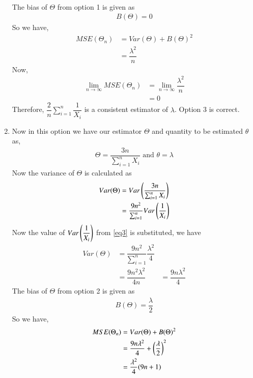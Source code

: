 \begin{enumerate}
\begin{align}
    \end{align}
    The bias of $ \Theta $ from option 1 is given as
    \begin{align}
        B(\Theta) = 0
    \end{align}
    So we have,
    \begin{align}
        MSE(\Theta_n) &= Var(\Theta) + B(\Theta)^2 \\
        &= \dfrac{\lambda^2}{n}
    \end{align}
    Now,
    \begin{align}
         \lim_{n\to\infty} MSE( \Theta_n) &=    \lim_{n\to\infty} \dfrac{\lambda^2}{n} \\
          &= 0
    \end{align}
    Therefore, $\dfrac{2}{n} \sum_{i=1}^{n} \dfrac{1}{X_i} $ is a consistent estimator of $ \lambda$. 
    Option 3 is correct. \\
    \item 
     Now in this option we have our estimator $ \Theta$ and quantity to be estimated $ \theta $ as,
     \begin{align}
         \Theta = \dfrac{3n}{\sum_{i=1}^{n} X_i } \text{  and  }
         \theta = \lambda
     \end{align}
    Now the variance of $ \Theta$ is calculated as
    \begin{align}
        Var(\Theta) &= Var\left(\dfrac{3n}{\sum_{i=1}^{n} X_i } \right) \\
        & = \dfrac{9n^2}{ \sum_{i=1}^{n}} Var\left(\dfrac{1}{X_i}\right) \\
    \end{align}
    Now the value of $ Var\left(\dfrac{1}{X_i}\right) $ from \eqref{eq3} is substituted, we have
    \begin{align}
         Var(\Theta) &= \dfrac{9n^2}{ \sum_{i=1}^{n}} \dfrac{\lambda^2}{4} \\
         & = \dfrac{9n^2 \lambda^2}{4n }
         & = \dfrac{9n \lambda^2}{4 }
    \end{align}
    The bias of $ \Theta $ from option 2 is given as
    \begin{align}
        B(\Theta) = \dfrac{\lambda}{2}
    \end{align}
    So we have,
    \begin{align}
        MSE(\Theta_n) &= Var(\Theta) + B(\Theta)^2 \\
        &= \dfrac{9n \lambda^2}{4 } + \brak{\dfrac{\lambda}{2}}^2 \\
        & = \dfrac{ \lambda^2}{4 } (9n+1)

\end{align}
\end{enumerate}

